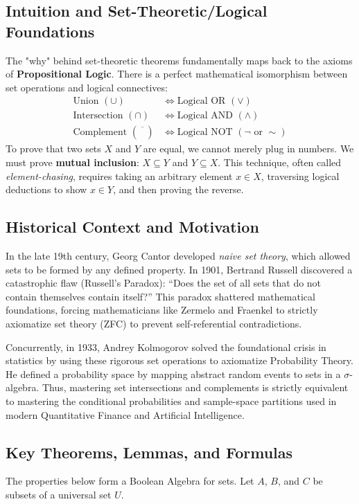 \documentclass[11pt]{article}
\theoremstyle{definition}
\begin{document}
\subsection{Intuition and Set-Theoretic/Logical Foundations}
The "why" behind set-theoretic theorems fundamentally maps back to the axioms of \textbf{Propositional Logic}. There is a perfect mathematical isomorphism between set operations and logical connectives:
\begin{align*}
    \text{Union } (\cup) &\iff \text{Logical OR } (\lor) \\
    \text{Intersection } (\cap) &\iff \text{Logical AND } (\land) \\
    \text{Complement } (\overline{\phantom{A}}) &\iff \text{Logical NOT } (\neg \text{ or } \sim)
\end{align*}
To prove that two sets $X$ and $Y$ are equal, we cannot merely plug in numbers. We must prove \textbf{mutual inclusion}: $X \subseteq Y$ and $Y \subseteq X$. This technique, often called \textit{element-chasing}, requires taking an arbitrary element $x \in X$, traversing logical deductions to show $x \in Y$, and then proving the reverse.

\subsection{Historical Context and Motivation}
In the late 19th century, Georg Cantor developed \textit{naive set theory}, which allowed sets to be formed by any defined property. In 1901, Bertrand Russell discovered a catastrophic flaw (Russell's Paradox): ``Does the set of all sets that do not contain themselves contain itself?'' This paradox shattered mathematical foundations, forcing mathematicians like Zermelo and Fraenkel to strictly axiomatize set theory (ZFC) to prevent self-referential contradictions. 

Concurrently, in 1933, Andrey Kolmogorov solved the foundational crisis in statistics by using these rigorous set operations to axiomatize Probability Theory. He defined a probability space by mapping abstract random events to sets in a $\sigma$-algebra. Thus, mastering set intersections and complements is strictly equivalent to mastering the conditional probabilities and sample-space partitions used in modern Quantitative Finance and Artificial Intelligence.

\subsection{Key Theorems, Lemmas, and Formulas}
The properties below form a Boolean Algebra for sets. Let $A$, $B$, and $C$ be subsets of a universal set $U$.
\end{document}
